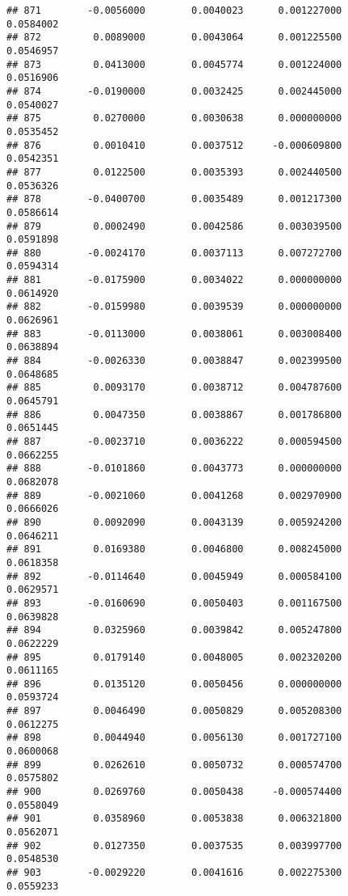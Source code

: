 \documentclass[
]{article}
\begin{document}
\begin{verbatim}
## 871        -0.0056000        0.0040023      0.001227000             0.0584002
## 872         0.0089000        0.0043064      0.001225500             0.0546957
## 873         0.0413000        0.0045774      0.001224000             0.0516906
## 874        -0.0190000        0.0032425      0.002445000             0.0540027
## 875         0.0270000        0.0030638      0.000000000             0.0535452
## 876         0.0010410        0.0037512     -0.000609800             0.0542351
## 877         0.0122500        0.0035393      0.002440500             0.0536326
## 878        -0.0400700        0.0035489      0.001217300             0.0586614
## 879         0.0002490        0.0042586      0.003039500             0.0591898
## 880        -0.0024170        0.0037113      0.007272700             0.0594314
## 881        -0.0175900        0.0034022      0.000000000             0.0614920
## 882        -0.0159980        0.0039539      0.000000000             0.0626961
## 883        -0.0113000        0.0038061      0.003008400             0.0638894
## 884        -0.0026330        0.0038847      0.002399500             0.0648685
## 885         0.0093170        0.0038712      0.004787600             0.0645791
## 886         0.0047350        0.0038867      0.001786800             0.0651445
## 887        -0.0023710        0.0036222      0.000594500             0.0662255
## 888        -0.0101860        0.0043773      0.000000000             0.0682078
## 889        -0.0021060        0.0041268      0.002970900             0.0666026
## 890         0.0092090        0.0043139      0.005924200             0.0646211
## 891         0.0169380        0.0046800      0.008245000             0.0618358
## 892        -0.0114640        0.0045949      0.000584100             0.0629571
## 893        -0.0160690        0.0050403      0.001167500             0.0639828
## 894         0.0325960        0.0039842      0.005247800             0.0622229
## 895         0.0179140        0.0048005      0.002320200             0.0611165
## 896         0.0135120        0.0050456      0.000000000             0.0593724
## 897         0.0046490        0.0050829      0.005208300             0.0612275
## 898         0.0044940        0.0056130      0.001727100             0.0600068
## 899         0.0262610        0.0050732      0.000574700             0.0575802
## 900         0.0269760        0.0050438     -0.000574400             0.0558049
## 901         0.0358960        0.0053838      0.006321800             0.0562071
## 902         0.0127350        0.0037535      0.003997700             0.0548530
## 903        -0.0029220        0.0041616      0.002275300             0.0559233

\end{verbatim}
\end{document}
